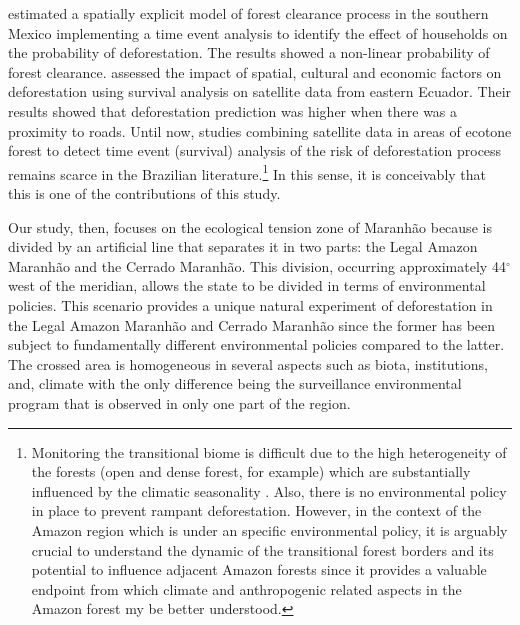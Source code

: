 \citet{vance_2002} estimated a spatially explicit model of forest clearance process in the southern Mexico implementing a time event analysis to identify the effect of households on the probability of deforestation. The results showed a non-linear probability of forest clearance. \citet{greenberg_2005} assessed the impact of spatial, cultural and economic factors on deforestation using survival analysis on satellite data from eastern Ecuador. Their results showed that deforestation prediction was higher when there was a proximity  to roads. Until now, studies combining satellite data in areas of ecotone forest to detect time event (survival) analysis of the risk of deforestation process remains scarce in the Brazilian literature.\footnote{Monitoring the transitional biome is difficult due to the high heterogeneity of the forests (open and dense forest, for example) which are substantially influenced by the climatic seasonality \citep{bayma_sano_2015}. Also, there is no environmental policy in place to prevent rampant deforestation. However, in the context of the Amazon region which is under an specific environmental policy, it is arguably crucial to understand the dynamic of the transitional forest borders and its potential to influence adjacent Amazon forests since it provides a valuable endpoint from which climate and anthropogenic related aspects in the Amazon forest my be better understood.} In this sense, it is conceivably that this is one of the contributions of this study.

Our study, then, focuses on the ecological tension zone of Maranhão because is divided by an artificial line that separates it in two parts: the Legal Amazon Maranhão and the Cerrado Maranhão. This division, occurring approximately 44$^{\circ}$ west of the meridian, allows the state to be divided in terms of environmental policies. This scenario provides a unique natural experiment of deforestation in the Legal Amazon Maranhão and Cerrado Maranhão since the former has been subject to fundamentally different environmental policies compared to the latter. The crossed area is homogeneous in several aspects such as biota, institutions, and, climate with the only difference being the surveillance environmental program that is observed in only one part of the region.

